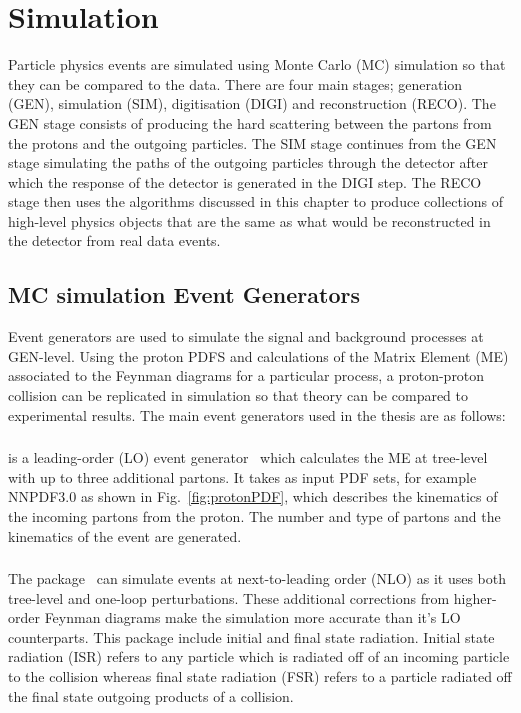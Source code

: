 \chapter{Simulation}
Particle physics events are simulated using Monte Carlo (MC) simulation so that they can be compared to the data. There are four main stages; generation (GEN), simulation (SIM), digitisation (DIGI) and reconstruction (RECO). The GEN stage consists of producing the hard scattering between the partons from the protons and the outgoing particles. The SIM stage continues from the GEN stage simulating the paths of the outgoing particles through the detector after which the response of the detector is generated in the DIGI step. The RECO stage then uses the algorithms discussed in this chapter to produce collections of high-level physics objects that are the same as what would be reconstructed in the detector from real data events.

\section{MC simulation Event Generators}

Event generators are used to simulate the signal and background processes at GEN-level. Using the proton PDFS and calculations of the Matrix Element (ME) associated to the Feynman diagrams for a particular process, a proton-proton collision can be replicated in simulation so that theory can be compared to experimental results. The main event generators used in the thesis are as follows:

\subsection{\MADGRAPH}
\MADGRAPH is a leading-order (LO) event generator~\cite{Alwall2011} which calculates the ME at tree-level with up to three additional partons. It takes as input PDF sets, for example NNPDF3.0 as shown in Fig.~\ref{fig:protonPDF}, which describes the kinematics of the incoming partons from the proton. The number and type of partons and the kinematics of the event are generated.
\subsection{\aMCATNLO}
The \aMCATNLO package~\cite{Degrande:2014sta} can simulate events at next-to-leading order (NLO) as it uses both tree-level and one-loop perturbations. These additional corrections from higher-order Feynman diagrams make the simulation more accurate than it's LO counterparts. This package include initial and final state radiation. Initial state radiation (ISR) refers to any particle which is radiated off of an incoming particle to the collision whereas final state radiation (FSR) refers to a particle radiated off the final state outgoing products of a collision.\\
